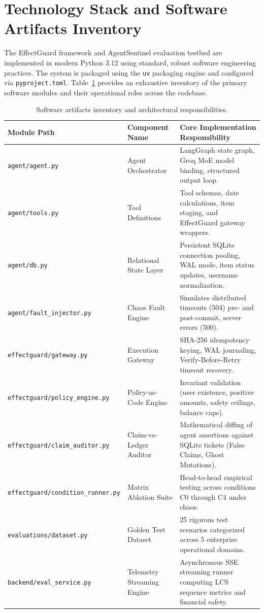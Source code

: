 \section{Technology Stack and Software Artifacts Inventory}
\label{sec:impl_stack}
The EffectGuard framework and AgentSentinel evaluation testbed are implemented in modern Python 3.12 using standard, robust software engineering practices. The system is packaged using the \texttt{uv} packaging engine and configured via \texttt{pyproject.toml}. Table~\ref{tab:impl_artifacts} provides an exhaustive inventory of the primary software modules and their operational roles across the codebase.

\begin{table}[H]
\centering
\small
\renewcommand{\arraystretch}{1.2}
\begin{tabularx}{\textwidth}{p{3.8cm}p{4.2cm}X}
\toprule
\textbf{Module Path} & \textbf{Component Name} & \textbf{Core Implementation Responsibility} \\
\midrule
\texttt{agent/agent.py} & Agent Orchestrator & LangGraph state graph, Groq MoE model binding, structured output loop. \\
\texttt{agent/tools.py} & Tool Definitions & Tool schemas, date calculations, item staging, and EffectGuard gateway wrappers. \\
\texttt{agent/db.py} & Relational State Layer & Persistent SQLite connection pooling, WAL mode, item status updates, username normalization. \\
\texttt{agent/fault\_injector.py} & Chaos Fault Engine & Simulates distributed timeouts (504) pre- and post-commit, server errors (500). \\
\texttt{effectguard/gateway.py} & Execution Gateway & SHA-256 idempotency keying, WAL journaling, Verify-Before-Retry timeout recovery. \\
\texttt{effectguard/policy\_engine.py}& Policy-as-Code Engine & Invariant validation (user existence, positive amounts, safety ceilings, balance caps). \\
\texttt{effectguard/claim\_auditor.py}& Claim-vs-Ledger Auditor & Mathematical diffing of agent assertions against SQLite tickets (False Claims, Ghost Mutations). \\
\texttt{effectguard/condition\_runner.py}& Matrix Ablation Suite & Head-to-head empirical testing across conditions C0 through C4 under chaos. \\
\texttt{evaluations/dataset.py} & Golden Test Dataset & 25 rigorous test scenarios categorized across 5 enterprise operational domains. \\
\texttt{backend/eval\_service.py} & Telemetry Streaming Engine & Asynchronous SSE streaming runner computing LCS sequence metrics and financial safety. \\
\bottomrule
\end{tabularx}
\caption{Software artifacts inventory and architectural responsibilities.}
\label{tab:impl_artifacts}
\end{table}

